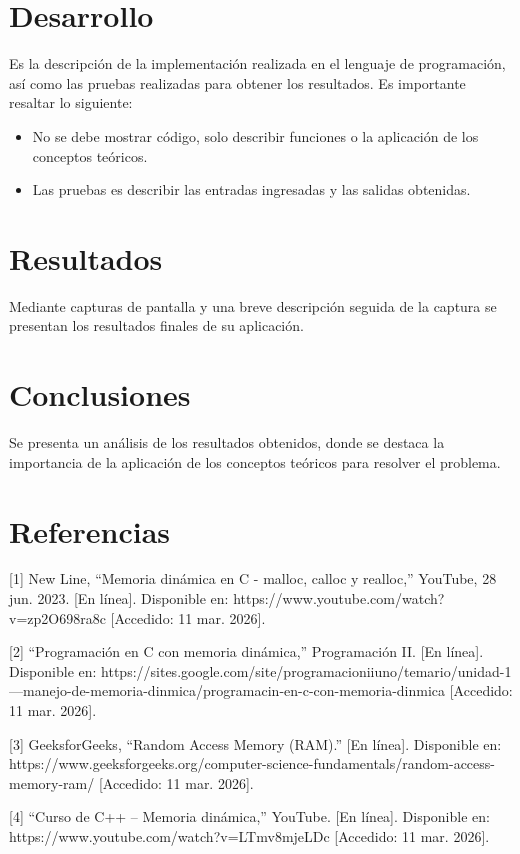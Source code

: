 \documentclass[letterpaper,12pt,oneside]{article}
\begin{document}
\section{Desarrollo}

Es la descripción de la implementación realizada en el lenguaje de programación, así como las pruebas realizadas para obtener los resultados. Es importante resaltar lo siguiente:

\begin{itemize}
\item No se debe mostrar código, solo describir funciones o la aplicación de los conceptos teóricos.
\item Las pruebas es describir las entradas ingresadas y las salidas obtenidas.
\end{itemize}

\section{Resultados}

Mediante capturas de pantalla y una breve descripción seguida de la captura se presentan los resultados finales de su aplicación.

\section{Conclusiones}

Se presenta un análisis de los resultados obtenidos, donde se destaca la importancia de la aplicación de los conceptos teóricos para resolver el problema.

\section*{Referencias}

[1] New Line, “Memoria dinámica en C - malloc, calloc y realloc,” YouTube, 28 jun. 2023. [En línea]. Disponible en: https://www.youtube.com/watch?v=zp2O698ra8c [Accedido: 11 mar. 2026].

[2] “Programación en C con memoria dinámica,” Programación II. [En línea]. Disponible en: https://sites.google.com/site/programacioniiuno/temario/unidad-1---manejo-de-memoria-dinmica/programacin-en-c-con-memoria-dinmica [Accedido: 11 mar. 2026].

[3] GeeksforGeeks, “Random Access Memory (RAM).” [En línea]. Disponible en: https://www.geeksforgeeks.org/computer-science-fundamentals/random-access-memory-ram/ [Accedido: 11 mar. 2026].

[4] “Curso de C++ – Memoria dinámica,” YouTube. [En línea]. Disponible en: https://www.youtube.com/watch?v=LTmv8mjeLDc [Accedido: 11 mar. 2026].
\end{document}
